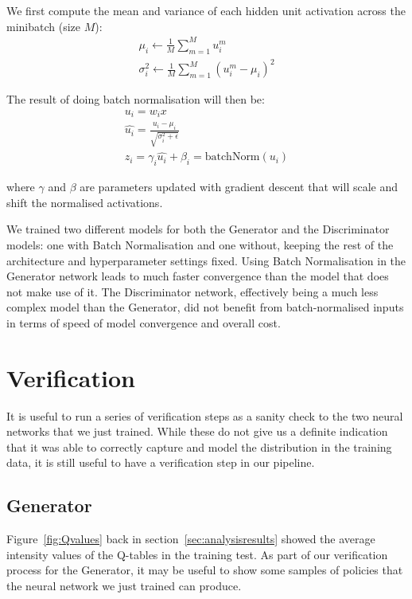 We first compute the mean and variance of each hidden unit activation across the minibatch (size $M$):
\begin{gather*}
\mu_i \leftarrow \frac{1}{M} \sum_{m=1}^{M}u_i^m \\
\sigma_i^2 \leftarrow \frac{1}{M} \sum_{m=1}^{M}(u_i^m - \mu_i)^2
\end{gather*}

The result of doing batch normalisation will then be:
\begin{gather*}
u_i = w_ix \\
\hat{u_i} = \frac{u_i-\mu_i}{\sqrt{\sigma_i^2 + \epsilon}} \\
z_i = \gamma_i\hat{u_i}+\beta_i = \text{batchNorm}({u_i})
\end{gather*}

where $\gamma$ and $\beta$ are parameters updated with gradient descent that will scale and shift the normalised activations.

We trained two different models for both the Generator and the Discriminator models: one with Batch Normalisation and one without, keeping the rest of the architecture and hyperparameter settings fixed.
Using Batch Normalisation in the Generator network leads to much faster convergence than the model that does not make use of it.
The Discriminator network, effectively being a much less complex model than the Generator, did not benefit from batch-normalised inputs in terms of speed of model convergence and overall cost.


\section{Verification}
It is useful to run a series of verification steps as a sanity check to the two neural networks that we just trained. While these do not give us a definite indication that it was able to correctly capture and model the distribution in the training data, it is still useful to have a verification step in our pipeline.

\subsection{Generator}
Figure~\ref{fig:Qvalues} back in section~\ref{sec:analysisresults} showed the average intensity values of the Q-tables in the training test. As part of our verification process for the Generator, it may be useful to show some samples of policies that the neural network we just trained can produce.

